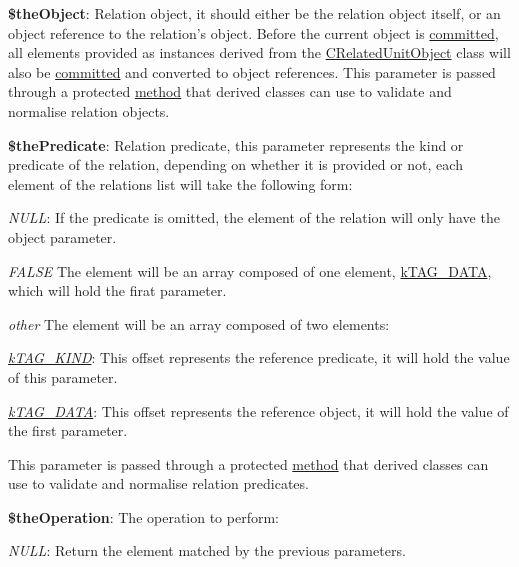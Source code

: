 \begin{DoxyItemize}
\item {\bfseries \$the\-Object}\-: Relation object, it should either be the relation object itself, or an object reference to the relation's object. Before the current object is \hyperlink{class_c_persistent_object_a88b1f2b11d3d60e0b3d33d8b0649b68a}{committed}, all elements provided as instances derived from the \hyperlink{class_c_related_unit_object}{C\-Related\-Unit\-Object} class will also be \hyperlink{class_c_persistent_unit_object_ae74127a9fb936d8cf5aeed30315ac05b}{committed} and converted to object references. This parameter is passed through a protected \hyperlink{class_c_persistent_unit_object_abdf69880df0ce8257c4d0fd64adc7053}{method} that derived classes can use to validate and normalise relation objects. 
\item {\bfseries \$the\-Predicate}\-: Relation predicate, this parameter represents the kind or predicate of the relation, depending on whether it is provided or not, each element of the relations list will take the following form\-: 
\begin{DoxyItemize}
\item {\itshape N\-U\-L\-L}\-: If the predicate is omitted, the element of the relation will only have the object parameter. 
\item {\itshape F\-A\-L\-S\-E} The element will be an array composed of one element, \hyperlink{}{k\-T\-A\-G\-\_\-\-D\-A\-T\-A}, which will hold the firat parameter. 
\item {\itshape other} The element will be an array composed of two elements\-: 
\begin{DoxyItemize}
\item {\itshape \hyperlink{}{k\-T\-A\-G\-\_\-\-K\-I\-N\-D}}\-: This offset represents the reference predicate, it will hold the value of this parameter. 
\item {\itshape \hyperlink{}{k\-T\-A\-G\-\_\-\-D\-A\-T\-A}}\-: This offset represents the reference object, it will hold the value of the first parameter. 
\end{DoxyItemize}This parameter is passed through a protected \hyperlink{class_c_persistent_unit_object_ad9c886156b37fa09552de223b1efddd6}{method} that derived classes can use to validate and normalise relation predicates. 
\end{DoxyItemize}
\item {\bfseries \$the\-Operation}\-: The operation to perform\-: 
\begin{DoxyItemize}
\item {\itshape N\-U\-L\-L}\-: Return the element matched by the previous parameters. 

\end{DoxyItemize}
\end{DoxyItemize}
